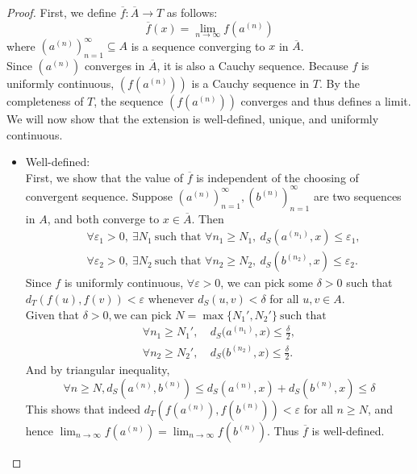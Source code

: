 \begin{proof}
    First, we define $\overline{f} : \overline{A} \to T$ as follows:
    \[
    \overline{f}(x) = \lim_{n \to \infty} f(a^{(n)})
    \]
    where $(a^{(n)})_{n=1}^\infty \subseteq A$ is a sequence converging to $x$ in $\overline{A}$. \\
    Since $(a^{(n)})$ converges in $\overline{A}$, it is also a Cauchy sequence. 
    Because $f$ is uniformly continuous, $(f(a^{(n)}))$ is a Cauchy sequence in $T$. 
    By the completeness of $T$, the sequence $(f(a^{(n)}))$ converges and thus defines a limit. \\[6pt]
    We will now show that the extension is well-defined, unique, and uniformly continuous.


    \begin{itemize}
        \item Well-defined: \\
        First, we show that the value of $\overline{f}$ is independent of the choosing of convergent sequence.
        Suppose $(a^{(n)})_{n=1}^\infty, (b^{(n)})_{n=1}^\infty$ are two sequences in $A$, and both converge to $x \in \overline{A}$.
        Then
        \[
        \begin{aligned}
        &\forall \varepsilon_1 > 0, \ \exists N_1 \ \text{such that } 
           \forall n_1 \ge N_1, \ d_S(a^{(n_1)}, x) \le \varepsilon_1, \\[6pt]
        &\forall \varepsilon_2 > 0, \ \exists N_2 \ \text{such that } 
           \forall n_2 \ge N_2, \ d_S(b^{(n_2)}, x) \le \varepsilon_2.
        \end{aligned}
        \]
        Since $f$ is uniformly continuous, $\forall \varepsilon > 0$, we can pick some $\delta > 0$ such that $d_T(f(u), f(v)) < \varepsilon$ whenever $d_S(u, v) < \delta$ for all $u, v \in A$. \\
        Given that $\delta > 0, \text{we can pick } N = \max\{N_1', N_2'\} \ \text{such that}$
        \[
        \begin{aligned}
        \forall n_1 \ge N_1',\ & d_S\!\bigl(a^{(n_1)}, x\bigr) \le \tfrac{\delta}{2}, \\[6pt]
        \forall n_2 \ge N_2',\ & d_S\!\bigl(b^{(n_2)}, x\bigr) \le \tfrac{\delta}{2}.
        \end{aligned}
        \]
        And by triangular inequality,
        \[
        \forall n \ge N, d_S(a^{(n)}, b^{(n)}) \le d_S(a^{(n)}, x) + d_S(b^{(n)}, x) \le \delta
        \]
        This shows that indeed $d_T(f(a^{(n)}), f(b^{(n)})) < \varepsilon$ for all $n \ge N$, and hence $\lim_{n \to \infty} f(a^{(n)}) =  \lim_{n \to \infty} f(b^{(n)})$. Thus $\overline{f}$ is well-defined.


\end{itemize}
\end{proof}
